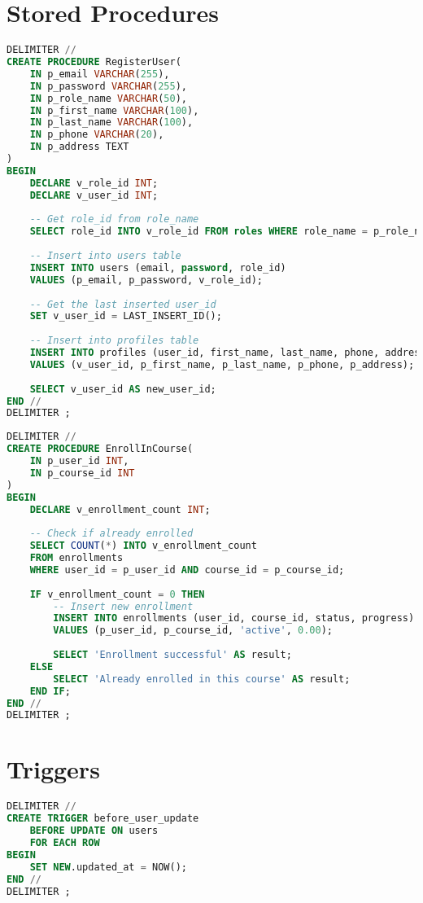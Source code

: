 \documentclass[12pt]{report}
\begin{document}
    \section{Stored Procedures}
    \begin{lstlisting}[language=SQL, caption=Stored Procedure for User Registration]
DELIMITER //
CREATE PROCEDURE RegisterUser(
    IN p_email VARCHAR(255),
    IN p_password VARCHAR(255),
    IN p_role_name VARCHAR(50),
    IN p_first_name VARCHAR(100),
    IN p_last_name VARCHAR(100),
    IN p_phone VARCHAR(20),
    IN p_address TEXT
)
BEGIN
    DECLARE v_role_id INT;
    DECLARE v_user_id INT;
    
    -- Get role_id from role_name
    SELECT role_id INTO v_role_id FROM roles WHERE role_name = p_role_name;
    
    -- Insert into users table
    INSERT INTO users (email, password, role_id) 
    VALUES (p_email, p_password, v_role_id);
    
    -- Get the last inserted user_id
    SET v_user_id = LAST_INSERT_ID();
    
    -- Insert into profiles table
    INSERT INTO profiles (user_id, first_name, last_name, phone, address)
    VALUES (v_user_id, p_first_name, p_last_name, p_phone, p_address);
    
    SELECT v_user_id AS new_user_id;
END //
DELIMITER ;
    \end{lstlisting}
    
    \begin{lstlisting}[language=SQL, caption=Stored Procedure for Enrolling in a Course]
DELIMITER //
CREATE PROCEDURE EnrollInCourse(
    IN p_user_id INT,
    IN p_course_id INT
)
BEGIN
    DECLARE v_enrollment_count INT;
    
    -- Check if already enrolled
    SELECT COUNT(*) INTO v_enrollment_count 
    FROM enrollments 
    WHERE user_id = p_user_id AND course_id = p_course_id;
    
    IF v_enrollment_count = 0 THEN
        -- Insert new enrollment
        INSERT INTO enrollments (user_id, course_id, status, progress)
        VALUES (p_user_id, p_course_id, 'active', 0.00);
        
        SELECT 'Enrollment successful' AS result;
    ELSE
        SELECT 'Already enrolled in this course' AS result;
    END IF;
END //
DELIMITER ;
    \end{lstlisting}
    
    \section{Triggers}
    \begin{lstlisting}[language=SQL, caption=Trigger to Update Timestamp]
DELIMITER //
CREATE TRIGGER before_user_update
    BEFORE UPDATE ON users
    FOR EACH ROW
BEGIN
    SET NEW.updated_at = NOW();
END //
DELIMITER ;
    \end{lstlisting}
    
\end{document}
